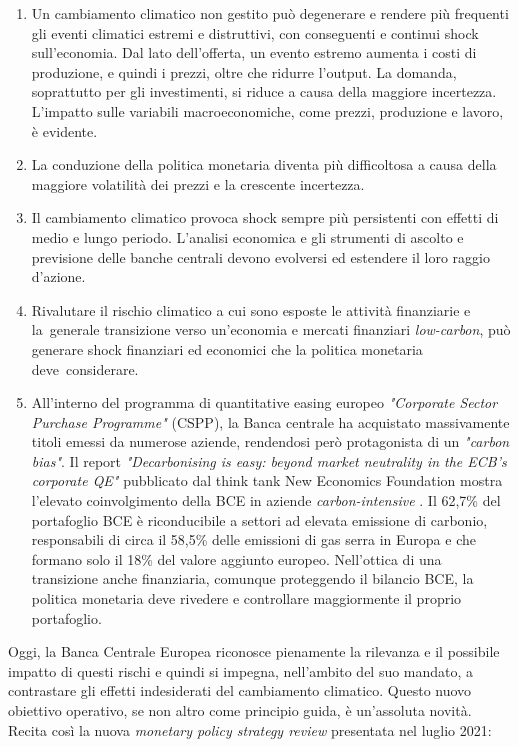 \begin{enumerate}
\item Un cambiamento climatico non gestito può degenerare e rendere più frequenti gli eventi climatici estremi e distruttivi, con conseguenti e continui shock sull'economia. Dal lato dell'offerta, un evento estremo aumenta i costi di produzione, e quindi i prezzi, oltre che ridurre l'output. La domanda, soprattutto per gli investimenti, si riduce a causa della maggiore incertezza. L'impatto sulle variabili macroeconomiche, come prezzi, produzione e lavoro, è evidente.

\item La conduzione della politica monetaria diventa più difficoltosa a causa della maggiore volatilità dei prezzi e la crescente incertezza.

\item Il cambiamento climatico provoca shock sempre più persistenti con effetti di medio e lungo periodo. L'analisi economica e gli strumenti di ascolto e previsione delle banche centrali devono evolversi ed estendere il loro raggio d'azione.

\item Rivalutare il rischio climatico a cui sono esposte le attività finanziarie e la~generale transizione verso un'economia e mercati finanziari \textit{low-carbon}, può generare shock finanziari ed economici che la politica monetaria deve~considerare.

\item All'interno del programma di quantitative easing europeo \textit{"Corporate Sector Purchase Programme"} (CSPP), la Banca centrale ha acquistato massivamente titoli emessi da numerose aziende, rendendosi però protagonista di un \textit{"carbon bias"}. Il report \textit{"Decarbonising is easy: beyond market neutrality in the ECB's corporate QE"} pubblicato dal think tank New Economics Foundation mostra l'elevato coinvolgimento della BCE in aziende \textit{carbon-intensive} \parencite{NEF:carbon_bias_report}. Il 62,7\% del portafoglio BCE è riconducibile a settori ad elevata emissione di carbonio, responsabili di circa il 58,5\% delle emissioni di gas serra in Europa e che formano solo il 18\% del valore aggiunto europeo. Nell'ottica di una transizione anche finanziaria, comunque proteggendo il bilancio BCE, la politica monetaria deve rivedere e controllare maggiormente il proprio portafoglio.
\end{enumerate}

Oggi, la Banca Centrale Europea riconosce pienamente la rilevanza e il possibile impatto di questi rischi e quindi si impegna, nell'ambito del suo mandato, a contrastare gli effetti indesiderati del cambiamento climatico. Questo nuovo obiettivo operativo, se non altro come principio guida, è un'assoluta novità. Recita così la nuova \textit{monetary policy strategy review} presentata nel luglio 2021:

